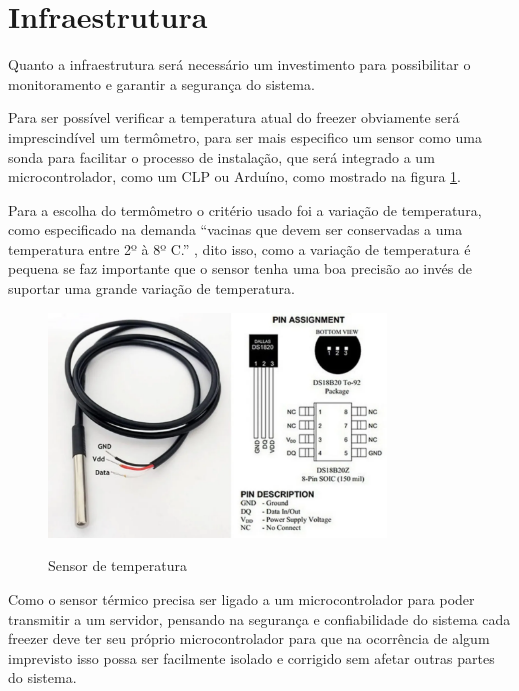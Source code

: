 \section{Infraestrutura}

    Quanto a infraestrutura será necessário um 
    investimento para possibilitar o monitoramento
    e garantir a segurança do sistema.

    Para ser possível verificar a temperatura atual do 
    freezer obviamente será imprescindível um termômetro,
    para ser mais especifico um sensor como uma sonda para facilitar
    o processo de instalação, que será integrado
    a um microcontrolador, como um CLP ou Arduíno, 
    como mostrado na figura \ref{fig:termometro}.

    Para a escolha do termômetro o critério usado foi 
    a variação de temperatura, como especificado na demanda
    ``vacinas que devem ser conservadas a uma temperatura entre 2º à 8º C.''
    ,
    dito isso, como a variação de temperatura é pequena se faz 
    importante que o sensor tenha uma boa precisão ao 
    invés de suportar uma grande variação de temperatura.

    \begin{figure}[h]
        \caption{Sensor de temperatura}
        \centering
        \includegraphics[width=0.8\textwidth]{img/termometro_esquema.png}
        \label{fig:termometro}
    \end{figure}


    Como o sensor térmico precisa ser ligado a um microcontrolador
    para poder transmitir a um servidor, pensando na segurança e 
    confiabilidade do sistema cada freezer deve ter seu próprio 
    microcontrolador para que na ocorrência de algum imprevisto
    isso possa ser facilmente isolado e corrigido sem afetar 
    outras partes do sistema.

